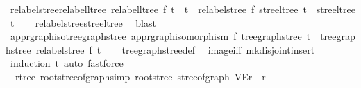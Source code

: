 \begin{isabellebody}
\endisatagproof
{\isafoldproof}%
%
\isadelimproof
\isanewline
%
\endisadelimproof
\isanewline
{}\isamarkupfalse%
\ relabel{\isacharunderscore}{\kern0pt}stree{\isacharunderscore}{\kern0pt}relabel{\isacharunderscore}{\kern0pt}ltree{\isacharcolon}{\kern0pt}\ {\isachardoublequoteopen}relabel{\isacharunderscore}{\kern0pt}ltree\ f\ t{}\ {\isacharequal}{\kern0pt}\ t{}\ {\isasymLongrightarrow}\ relabel{\isacharunderscore}{\kern0pt}stree\ f\ {\isacharparenleft}{\kern0pt}stree{\isacharunderscore}{\kern0pt}ltree\ t{}{\isacharparenright}{\kern0pt}\ {\isacharequal}{\kern0pt}\ stree{\isacharunderscore}{\kern0pt}ltree\ t{}{\isachardoublequoteclose}\isanewline
%
\isadelimproof
\ \ %
\endisadelimproof
%
\isatagproof
{}\isamarkupfalse%
\ relabel{\isacharunderscore}{\kern0pt}stree{\isacharunderscore}{\kern0pt}stree{\isacharunderscore}{\kern0pt}ltree\ \isamarkupfalse%
\ blast%
\endisatagproof
{\isafoldproof}%
%
\isadelimproof
\isanewline
%
\endisadelimproof
\isanewline
\isanewline
{}\isamarkupfalse%
\ app{\isacharunderscore}{\kern0pt}rgraph{\isacharunderscore}{\kern0pt}iso{\isacharunderscore}{\kern0pt}tree{\isacharunderscore}{\kern0pt}graph{\isacharunderscore}{\kern0pt}stree{\isacharcolon}{\kern0pt}\ {\isachardoublequoteopen}app{\isacharunderscore}{\kern0pt}rgraph{\isacharunderscore}{\kern0pt}isomorphism\ f\ {\isacharparenleft}{\kern0pt}tree{\isacharunderscore}{\kern0pt}graph{\isacharunderscore}{\kern0pt}stree\ t{\isacharparenright}{\kern0pt}\ {\isacharequal}{\kern0pt}\ tree{\isacharunderscore}{\kern0pt}graph{\isacharunderscore}{\kern0pt}stree\ {\isacharparenleft}{\kern0pt}relabel{\isacharunderscore}{\kern0pt}stree\ f\ t{\isacharparenright}{\kern0pt}{\isachardoublequoteclose}\isanewline
%
\isadelimproof
\ \ %
\endisadelimproof
%
\isatagproof
{}\isamarkupfalse%
\ tree{\isacharunderscore}{\kern0pt}graph{\isacharunderscore}{\kern0pt}stree{\isacharunderscore}{\kern0pt}def\ \isamarkupfalse%
\ image{\isacharunderscore}{\kern0pt}iff\ mk{\isacharunderscore}{\kern0pt}disjoint{\isacharunderscore}{\kern0pt}insert\isanewline
\ \ \isamarkupfalse%
\ {\isacharparenleft}{\kern0pt}induction\ t{\isacharparenright}{\kern0pt}\ {\isacharparenleft}{\kern0pt}auto{\isacharcomma}{\kern0pt}\ fastforce{\isacharplus}{\kern0pt}{\isacharparenright}{\kern0pt}%
\endisatagproof
{\isafoldproof}%
%
\isadelimproof
\isanewline
%
\endisadelimproof
\isanewline
{}\isamarkupfalse%
\ {\isacharparenleft}{\kern0pt}\ rtree{\isacharparenright}{\kern0pt}\ root{\isacharunderscore}{\kern0pt}stree{\isacharunderscore}{\kern0pt}of{\isacharunderscore}{\kern0pt}graph{\isacharbrackleft}{\kern0pt}simp{\isacharbrackright}{\kern0pt}{\isacharcolon}{\kern0pt}\ {\isachardoublequoteopen}root{\isacharunderscore}{\kern0pt}stree\ {\isacharparenleft}{\kern0pt}stree{\isacharunderscore}{\kern0pt}of{\isacharunderscore}{\kern0pt}graph\ {\isacharparenleft}{\kern0pt}V{\isacharcomma}{\kern0pt}E{\isacharcomma}{\kern0pt}r{\isacharparenright}{\kern0pt}{\isacharparenright}{\kern0pt}\ {\isacharequal}{\kern0pt}\ r{\isachardoublequoteclose}\isanewline

\end{isabellebody}
